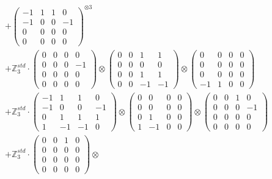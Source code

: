 \documentclass{article}
\begin{document}
{\begin{align}
        &+ \label{Rs16-Rc11-Solution-26-c16} \begin{pmatrix} -1 & 1 & 1 & 0 \\ -1 & 0 & 0 & -1 \\ 0 & 0 & 0 & 0 \\ 0 & 0 & 0 & 0 \end{pmatrix}^{\otimes 3} \\
        &+ \label{Rs16-Rc11-Solution-26-c17} \mathbb{Z}_3^{std} \cdot 
            \begin{pmatrix} 0 & 0 & 0 & 0 \\ 0 & 0 & 0 & -1 \\ 0 & 0 & 0 & 0 \\ 0 & 0 & 0 & 0 \end{pmatrix} \otimes 
            \begin{pmatrix} 0 & 0 & 1 & 1 \\ 0 & 0 & 0 & 0 \\ 0 & 0 & 1 & 1 \\ 0 & 0 & -1 & -1 \end{pmatrix} \otimes 
            \begin{pmatrix} 0 & 0 & 0 & 0 \\ 0 & 0 & 0 & 0 \\ 0 & 0 & 0 & 0 \\ -1 & 1 & 0 & 0 \end{pmatrix} \\ 
        &+ \label{Rs16-Rc11-Solution-26-c18} \mathbb{Z}_3^{std} \cdot 
            \begin{pmatrix} -1 & 1 & 1 & 0 \\ -1 & 0 & 0 & -1 \\ 0 & 1 & 1 & 1 \\ 1 & -1 & -1 & 0 \end{pmatrix} \otimes 
            \begin{pmatrix} 0 & 0 & 0 & 0 \\ 0 & 0 & 0 & 0 \\ 0 & 1 & 0 & 0 \\ 1 & -1 & 0 & 0 \end{pmatrix} \otimes 
            \begin{pmatrix} 0 & 0 & 1 & 0 \\ 0 & 0 & 0 & -1 \\ 0 & 0 & 0 & 0 \\ 0 & 0 & 0 & 0 \end{pmatrix} \\ 
        &+ \label{Rs16-Rc11-Solution-26-c19} \mathbb{Z}_3^{std} \cdot 
            \begin{pmatrix} 0 & 0 & 1 & 0 \\ 0 & 0 & 0 & 0 \\ 0 & 0 & 0 & 0 \\ 0 & 0 & 0 & 0 \end{pmatrix} \otimes 

\end{align}}
\end{document}

